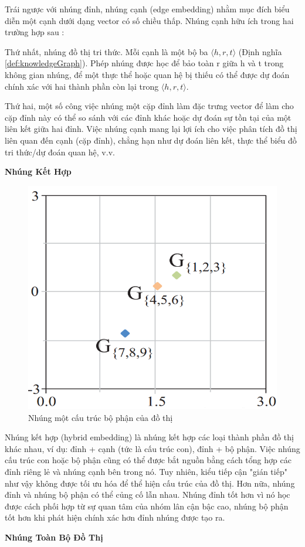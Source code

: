 Trái ngược với nhúng đỉnh, nhúng cạnh (edge embedding) nhằm mục đích biểu diễn một cạnh dưới dạng vector có số chiều thấp. Nhúng cạnh hữu ích trong hai trường hợp sau :

Thứ nhất, nhúng đồ thị tri thức. Mỗi cạnh là một bộ ba $\langle h, r, t \rangle$ (Định nghĩa \ref{def:knowledgeGraph}). Phép nhúng được học để bảo toàn r giữa h và t trong không gian nhúng, để một thực thể hoặc quan hệ bị thiếu có thể được dự đoán chính xác với hai thành phần còn lại trong $\langle h, r, t \rangle$.

Thứ hai, một số công việc nhúng một cặp đỉnh làm đặc trưng vector để làm cho cặp đỉnh này có thể so sánh với các đỉnh khác hoặc dự đoán sự tồn tại của một liên kết giữa hai đỉnh. Việc nhúng cạnh mang lại lợi ích cho việc phân tích đồ thị liên quan đến cạnh (cặp đỉnh), chẳng hạn như dự đoán liên kết, thực thể biểu đồ tri thức/dự đoán quan hệ, v.v.

\textbf{Nhúng Kết Hợp}

\begin{figure}[htp]
	\centering
	\includegraphics[width=6 cm]{images/graph_emb_4.png}
	\caption{Nhúng một cấu trúc bộ phận của đồ thị}
	\label{fig:substructureEmbedding}
\end{figure}

Nhúng kết hợp (hybrid embedding) là nhúng kết hợp các loại thành phần đồ thị khác nhau, ví dụ: đỉnh + cạnh (tức là cấu trúc con), đỉnh + bộ phận. Việc nhúng cấu trúc con hoặc bộ phận cũng có thể được bắt nguồn bằng cách tổng hợp các đỉnh riêng lẻ và nhúng cạnh bên trong nó. Tuy nhiên, kiểu tiếp cận "gián tiếp" như vậy không được tối ưu hóa để thể hiện cấu trúc của đồ thị. Hơn nữa, nhúng đỉnh và nhúng bộ phận có thể củng cố lẫn nhau. Nhúng đỉnh tốt hơn vì nó học được cách phối hợp từ sự quan tâm của nhóm lân cận bậc cao, nhúng bộ phận tốt hơn khi phát hiện chính xác hơn đỉnh nhúng được tạo ra.

\textbf{Nhúng Toàn Bộ Đồ Thị}

